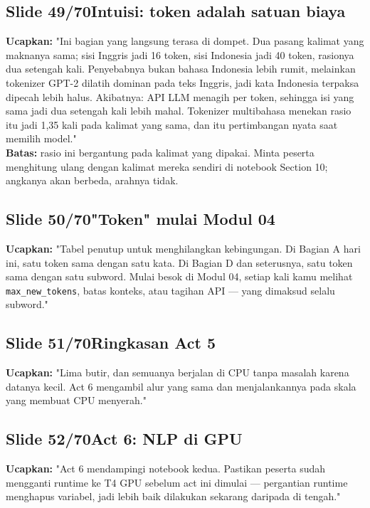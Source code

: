 \documentclass[11pt]{article}
\renewcommand{\framebox}[1]{\colorbox{acc!15}{\textcolor{acc}{\textbf{#1}}}}
\begin{document}
\subsection*{\framebox{Slide 49/70}\quad Intuisi: token adalah satuan biaya}
\textbf{Ucapkan:} "Ini bagian yang langsung terasa di dompet. Dua pasang kalimat yang maknanya sama; sisi Inggris jadi 16 token, sisi Indonesia jadi 40 token, rasionya dua setengah kali. Penyebabnya bukan bahasa Indonesia lebih rumit, melainkan tokenizer GPT-2 dilatih dominan pada teks Inggris, jadi kata Indonesia terpaksa dipecah lebih halus. Akibatnya: API LLM menagih per token, sehingga isi yang sama jadi dua setengah kali lebih mahal. Tokenizer multibahasa menekan rasio itu jadi 1,35 kali pada kalimat yang sama, dan itu pertimbangan nyata saat memilih model."\\[2pt]
\textbf{Batas:} rasio ini bergantung pada kalimat yang dipakai. Minta peserta menghitung ulang dengan kalimat mereka sendiri di notebook Section 10; angkanya akan berbeda, arahnya tidak.\\[2pt]

\subsection*{\framebox{Slide 50/70}\quad "Token" mulai Modul 04}
\textbf{Ucapkan:} "Tabel penutup untuk menghilangkan kebingungan. Di Bagian A hari ini, satu token sama dengan satu kata. Di Bagian D dan seterusnya, satu token sama dengan satu subword. Mulai besok di Modul 04, setiap kali kamu melihat \texttt{max\_new\_tokens}, batas konteks, atau tagihan API — yang dimaksud selalu subword."\\[2pt]

\subsection*{\framebox{Slide 51/70}\quad Ringkasan Act 5}
\textbf{Ucapkan:} "Lima butir, dan semuanya berjalan di CPU tanpa masalah karena datanya kecil. Act 6 mengambil alur yang sama dan menjalankannya pada skala yang membuat CPU menyerah."\\[2pt]

\subsection*{\framebox{Slide 52/70}\quad Act 6: NLP di GPU}
\textbf{Ucapkan:} "Act 6 mendampingi notebook kedua. Pastikan peserta sudah mengganti runtime ke T4 GPU sebelum act ini dimulai — pergantian runtime menghapus variabel, jadi lebih baik dilakukan sekarang daripada di tengah."\\[2pt]
\end{document}

